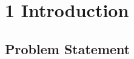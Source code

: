 

\chapter*{1 Introduction}
\label{intro}
\setcounter{chapter}{1}
\setcounter{section}{0}
\section{Problem Statement}
\label{ps}

